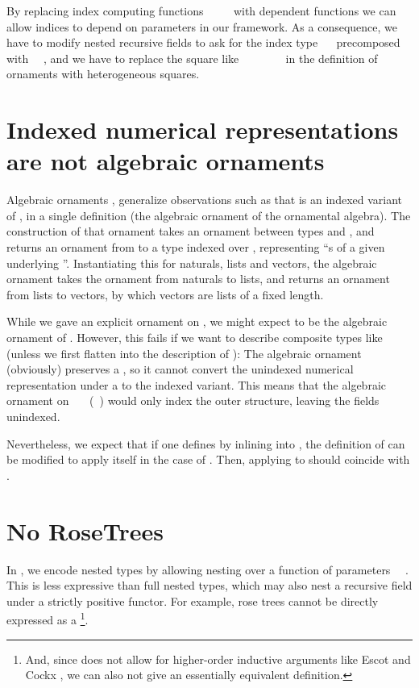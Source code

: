 By replacing index computing functions \ \AF{\&}\ \ \  with dependent functions
we can allow indices to depend on parameters in our framework. As a consequence, we have to modify nested recursive fields to ask for the index type \ \  precomposed with \ \ , and we have to replace the square like \ \ \ \ \ \ \  in the definition of ornaments with heterogeneous squares.


\section{Indexed numerical representations are not algebraic ornaments}\label{sec:ix-not-alg}
Algebraic ornaments \cite{algorn}, generalize observations such as that  is an indexed variant of , in a single definition  (the algebraic ornament of the ornamental algebra). The construction of that ornament takes an ornament between types  and , and returns an ornament from  to a type indexed over , representing ``s of a given underlying ''. Instantiating this for naturals, lists and vectors, the algebraic ornament takes the ornament from naturals to lists, and returns an ornament from lists to vectors, by which vectors are lists of a fixed length.

While we gave an explicit ornament  on , we might expect  to be the algebraic ornament of . However, this fails if we want to describe composite types like  (unless we first flatten  into the description of ): The algebraic ornament (obviously) preserves a , so it cannot convert the unindexed numerical representation under a  to the indexed variant. This means that the algebraic ornament on \ \AV{=}\ \ (\ ) would only index the outer structure, leaving the  fields unindexed.

Nevertheless, we expect that if one defines  by inlining  into , the definition of  can be modified to apply itself in the case of . Then, applying  to  should coincide with .


\section{No RoseTrees}
In , we encode nested types by allowing nesting over a function of parameters \ \ . This is less expressive than full nested types, which may also nest a recursive field under a strictly positive functor. For example, rose trees
cannot be directly expressed as a \footnote{And, since  does not allow for higher-order inductive arguments like Escot and Cockx \cite{practgen}, we can also not give an essentially equivalent definition.}.

